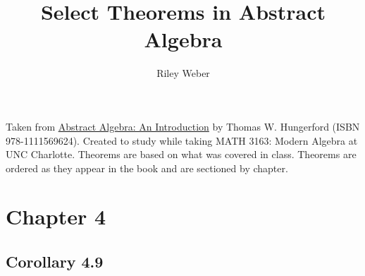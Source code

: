 \documentclass{article}
\theoremstyle{break}
\begin{document}
\title{Select Theorems in Abstract Algebra}
\author{Riley Weber}
\maketitle

Taken from \underline{Abstract Algebra: An Introduction} by Thomas W.
Hungerford (ISBN 978-1111569624). Created to study while taking MATH 3163:
Modern Algebra at UNC Charlotte. Theorems are based on what was covered in
class. Theorems are ordered as they appear in the book and are sectioned by
chapter.

\section*{Chapter 4}
\subsection*{Corollary 4.9}
\end{document}
